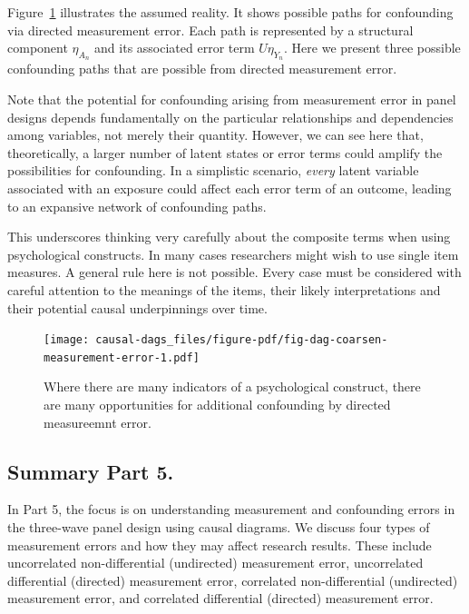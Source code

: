 \documentclass[
  singlecolumn]{report}
\begin{document}
Figure~\ref{fig-dag-coarsen-measurement-error} illustrates the assumed
reality. It shows possible paths for confounding via directed
measurement error. Each path is represented by a structural component
\(\eta_{A_n}\) and its associated error term \(U\eta_{Y_n}\). Here we
present three possible confounding paths that are possible from directed
measurement error.

Note that the potential for confounding arising from measurement error
in panel designs depends fundamentally on the particular relationships
and dependencies among variables, not merely their quantity. However, we
can see here that, theoretically, a larger number of latent states or
error terms could amplify the possibilities for confounding. In a
simplistic scenario, \emph{every} latent variable associated with an
exposure could affect each error term of an outcome, leading to an
expansive network of confounding paths.

This underscores thinking very carefully about the composite terms when
using psychological constructs. In many cases researchers might wish to
use single item measures. A general rule here is not possible. Every
case must be considered with careful attention to the meanings of the
items, their likely interpretations and their potential causal
underpinnings over time.

\begin{figure}

{\centering \texttt{[image: causal-dags\_files/figure-pdf/fig-dag-coarsen-measurement-error-1.pdf]}

}

\caption{\label{fig-dag-coarsen-measurement-error}Where there are many
indicators of a psychological construct, there are many opportunities
for additional confounding by directed measureemnt error.}

\end{figure}

\hypertarget{summary-part-5.}{%
\subsection{Summary Part 5.}\label{summary-part-5.}}

In Part 5, the focus is on understanding measurement and confounding
errors in the three-wave panel design using causal diagrams. We discuss
four types of measurement errors and how they may affect research
results. These include uncorrelated non-differential (undirected)
measurement error, uncorrelated differential (directed) measurement
error, correlated non-differential (undirected) measurement error, and
correlated differential (directed) measurement error.
\end{document}
